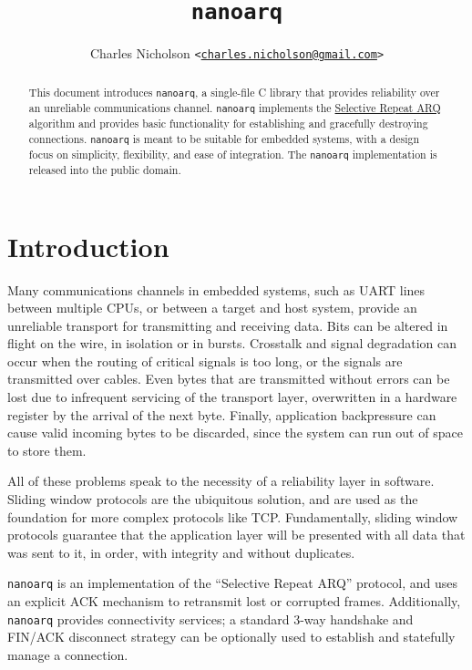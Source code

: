 \documentclass[11pt]{article}
\newcommand{\nanoarq}{\texttt{nanoarq}}
\begin{document}
\title{\nanoarq{}}
\author{Charles Nicholson \texttt{<\href{mailto:charles.nicholson@gmail.com}{charles.nicholson@gmail.com}>}}
\date{}
\maketitle

\begin{abstract}
    This document introduces \nanoarq{}, a single-file C library that provides reliability over an unreliable communications channel. \nanoarq{} implements the \href{https://en.wikipedia.org/wiki/Selective_Repeat_ARQ}{Selective Repeat ARQ}   algorithm and provides basic functionality for establishing and gracefully destroying connections. \nanoarq{} is meant to be suitable for embedded systems, with a design focus on simplicity, flexibility, and ease of integration. The \nanoarq{} implementation is released into the public domain.
\end{abstract}

\section{Introduction}
Many communications channels in embedded systems, such as UART lines between multiple CPUs, or between a target and host system, provide an unreliable transport for transmitting and receiving data. Bits can be altered in flight on the wire, in isolation or in bursts. Crosstalk and signal degradation can occur when the routing of critical signals is too long, or the signals are transmitted over cables. Even bytes that are transmitted without errors can be lost due to infrequent servicing of the transport layer, overwritten in a hardware register by the arrival of the next byte. Finally, application backpressure can cause valid incoming bytes to be discarded, since the system can run out of space to store them. \par
All of these problems speak to the necessity of a reliability layer in software. Sliding window protocols are the ubiquitous solution, and are used as the foundation for more complex protocols like TCP. Fundamentally, sliding window protocols guarantee that the application layer will be presented with all data that was sent to it, in order, with integrity and without duplicates. \par
\nanoarq{} is an implementation of the \enquote{Selective Repeat ARQ} protocol, and uses an explicit ACK mechanism to retransmit lost or corrupted frames. Additionally, \nanoarq{} provides connectivity services; a standard 3-way handshake and FIN/ACK disconnect strategy can be optionally used to establish and statefully manage a connection.
\end{document}
